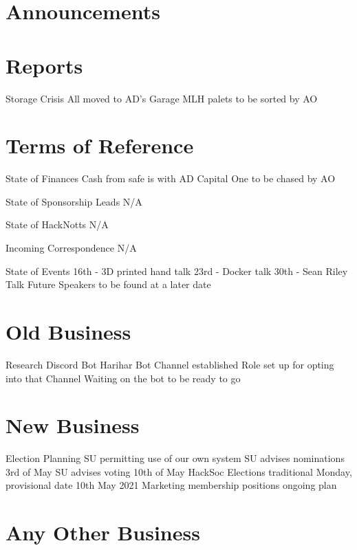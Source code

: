 \documentclass[11pt,hacksoc]{meetingmins}
\begin{document}
\maketitle

\section{Announcements}

\section{Reports}
\begin{items}
\item Storage Crisis
\subitem All moved to AD's Garage
\subitem MLH palets to be sorted by AO
\end{items}

\section{Terms of Reference}
\begin{items}
\item {State of Finances}
\subitem Cash from safe is with AD
\subitem Capital One to be chased by AO
\item {State of Sponsorship Leads}
\subitem N/A
\item {State of HackNotts}
\subitem N/A
\item {Incoming Correspondence}
\subitem N/A
\item {State of Events}
\subitem 16th - 3D printed hand talk
\subitem 23rd - Docker talk
\subitem 30th - Sean Riley Talk
\subitem Future Speakers to be found at a later date
\end{items}

\section{Old Business}
\begin{items}
\item Research Discord Bot
\subitem Harihar Bot Channel established
\subitem Role set up for opting into that Channel
\subitem Waiting on the bot to be ready to go
\end{items}

\section{New Business}
\begin{items}
\item Election Planning
\subitem SU permitting use of our own system
\subitem SU advises nominations 3rd of May
\subitem SU advises voting 10th of May
\subitem HackSoc Elections traditional Monday, provisional date 10th May 2021
\subitem Marketing membership positions ongoing plan

\end{items}

\section{Any Other Business}

\vspace{1em}
\end{document}
